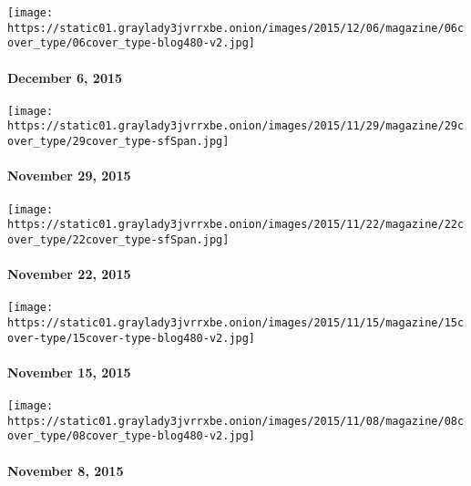 \texttt{[image: https://static01.graylady3jvrrxbe.onion/images/2015/12/06/magazine/06cover\_type/06cover\_type-blog480-v2.jpg]}

\hypertarget{december-6-2015}{%
\paragraph{December 6, 2015}\label{december-6-2015}}

\href{http://www.nytimes3xbfgragh.onion/indexes/2015/11/29/magazine/index.html}{}

\texttt{[image: https://static01.graylady3jvrrxbe.onion/images/2015/11/29/magazine/29cover\_type/29cover\_type-sfSpan.jpg]}

\hypertarget{november-29-2015}{%
\paragraph{November 29, 2015}\label{november-29-2015}}

\href{http://www.nytimes3xbfgragh.onion/indexes/2015/11/22/magazine/index.html}{}

\texttt{[image: https://static01.graylady3jvrrxbe.onion/images/2015/11/22/magazine/22cover\_type/22cover\_type-sfSpan.jpg]}

\hypertarget{november-22-2015}{%
\paragraph{November 22, 2015}\label{november-22-2015}}

\href{http://www.nytimes3xbfgragh.onion/indexes/2015/11/15/magazine/index.html}{}

\texttt{[image: https://static01.graylady3jvrrxbe.onion/images/2015/11/15/magazine/15cover-type/15cover-type-blog480-v2.jpg]}

\hypertarget{november-15-2015}{%
\paragraph{November 15, 2015}\label{november-15-2015}}

\href{http://www.nytimes3xbfgragh.onion/indexes/2015/11/08/magazine/index.html}{}

\texttt{[image: https://static01.graylady3jvrrxbe.onion/images/2015/11/08/magazine/08cover\_type/08cover\_type-blog480-v2.jpg]}

\hypertarget{november-8-2015}{%
\paragraph{November 8, 2015}\label{november-8-2015}}

